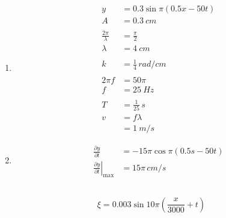 \documentclass{article}
\begin{document}
\begin{enumerate}
  \item

        \begin{align*}
          y                     & = 0.3 \sin \pi (0.5 x - 50 t) \\
          A                     & = \qty{0.3}{cm}               \\ \\
          \frac{2 \pi}{\lambda} & = \frac{\pi}{2}               \\
          \lambda               & = \qty{4}{cm}                 \\ \\
          k                     & = \frac{1}{4} \,\unit{rad/cm} \\ \\
          2 \pi f               & = 50 \pi                      \\
          f                     & = \qty{25}{Hz}                \\ \\
          T                     & = \frac{1}{25} \,\unit{s}     \\
          v                     & = f \lambda                   \\
                                & = \qty{1}{m/s}
        \end{align*}

  \item

        \begin{align*}
          \frac{\partial y}{\partial t}                           & = -15 \pi \cos \pi (0.5 s - 50 t) \\
          \left. \frac{\partial y}{\partial t} \right|_\text{max} & = 15 \pi \,\unit{cm/s}
        \end{align*}
\end{enumerate}

\subsection{}

\[\xi = 0.003 \sin 10 \pi \left( \frac{x}{3000} + t \right)\]

\subsection{}
\end{document}

